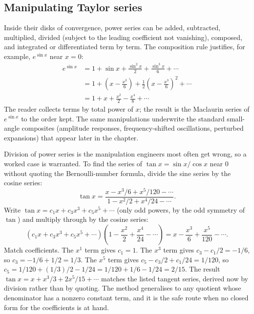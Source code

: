 \subsection{Manipulating Taylor series}

Inside their disks of convergence, power series can be added,
subtracted, multiplied, divided (subject to the leading coefficient
not vanishing), composed, and integrated or differentiated term by
term. The composition rule justifies, for example, $e^{\sin x}$ near
$x = 0$:
\begin{align*}
e^{\sin x} &= 1 + \sin x + \frac{\sin^{2} x}{2} + \frac{\sin^{3} x}{6}
+ \cdots \\
&= 1 + \left(x - \frac{x^{3}}{6}\right) + \frac{1}{2}\left(x -
\frac{x^{3}}{6}\right)^{2} + \cdots \\
&= 1 + x + \frac{x^{2}}{2} - \frac{x^{4}}{8} + \cdots
\end{align*}
The reader collects terms by total power of $x$; the result is the
Maclaurin series of $e^{\sin x}$ to the order kept. The same
manipulations underwrite the standard small-angle composites
(amplitude responses, frequency-shifted oscillations, perturbed
expansions) that appear later in the chapter.

Division of power series is the manipulation engineers most often get
wrong, so a worked case is warranted. To find the series of $\tan x =
\sin x / \cos x$ near $0$ without quoting the Bernoulli-number formula,
divide the sine series by the cosine series:
\[
\tan x = \frac{x - x^{3}/6 + x^{5}/120 - \cdots}{1 - x^{2}/2 +
x^{4}/24 - \cdots}.
\]
Write $\tan x = c_{1} x + c_{3} x^{3} + c_{5} x^{5} + \cdots$ (only odd
powers, by the odd symmetry of $\tan$) and multiply through by the
cosine series:
\[
\left(c_{1} x + c_{3} x^{3} + c_{5} x^{5} + \cdots\right)
\left(1 - \frac{x^{2}}{2} + \frac{x^{4}}{24} - \cdots\right) = x -
\frac{x^{3}}{6} + \frac{x^{5}}{120} - \cdots.
\]
Match coefficients. The $x^{1}$ term gives $c_{1} = 1$. The $x^{3}$
term gives $c_{3} - c_{1}/2 = -1/6$, so $c_{3} = -1/6 + 1/2 = 1/3$. The
$x^{5}$ term gives $c_{5} - c_{3}/2 + c_{1}/24 = 1/120$, so $c_{5} =
1/120 + (1/3)/2 - 1/24 = 1/120 + 1/6 - 1/24 = 2/15$. The result
$\tan x = x + x^{3}/3 + 2 x^{5}/15 + \cdots$ matches the listed
tangent series, derived now by division rather than by quoting. The
method generalises to any quotient whose denominator has a nonzero
constant term, and it is the safe route when no closed form for the
coefficients is at hand.

